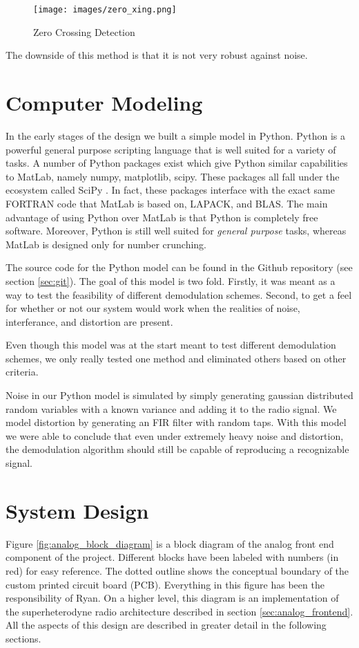 \documentclass[a4paper, 12pt, notitlepage]{article}
\begin{document}
\begin{figure}
  \centering
  \caption{Zero Crossing Detection}
  \label{fig:zero_xing}
  \texttt{[image: images/zero\_xing.png]}
\end{figure}

The downside of this method is that it is not very robust against noise.  

\section{Computer Modeling}
\label{sec:model}
In the early stages of the design we built a simple model in Python.  Python is a powerful general purpose scripting language that is well suited for a variety of tasks.  A number of Python packages exist which give Python similar capabilities to MatLab, namely numpy, matplotlib, scipy.  These packages all fall under the ecosystem called SciPy \cite{scipy}.  In fact, these packages interface with the exact same FORTRAN code that MatLab is based on, LAPACK\cite{lapack}, and BLAS\cite{blas}.  The main advantage of using Python over MatLab is that Python is completely free software.  Moreover, Python is still well suited for \textit{general purpose} tasks, whereas MatLab is designed only for number crunching.

The source code for the Python model can be found in the Github repository (see section \ref{sec:git}).  The goal of this model is two fold.  Firstly, it was meant as a way to test the feasibility of different demodulation schemes.  Second, to get a feel for whether or not our system would work when the realities of noise, interferance, and distortion are present.

Even though this model was at the start meant to test different demodulation schemes, we only really tested one method and eliminated others based on other criteria.

Noise in our Python model is simulated by simply generating gaussian distributed random variables with a known variance and adding it to the radio signal.  We model distortion by generating an FIR filter with random taps.  With this model we were able to conclude that even under extremely heavy noise and distortion, the demodulation algorithm should still be capable of reproducing a recognizable signal.

\section{System Design}
Figure \ref{fig:analog_block_diagram} is a block diagram of the analog front end component of the project.  Different blocks have been labeled with numbers (in red) for easy reference.  The dotted outline shows the conceptual boundary of the custom printed circuit board (PCB).  Everything in this figure has been the responsibility of Ryan.  On a higher level, this diagram is an implementation of the superheterodyne radio architecture described in section \ref{sec:analog_frontend}.  All the aspects of this design are described in greater detail in the following sections.
\end{document}
